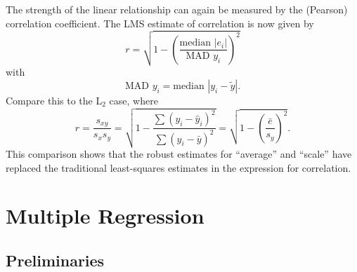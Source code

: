 The strength of the linear relationship can again be measured by the (Pearson) correlation 
coefficient.  The LMS estimate of correlation is now given by
\begin{equation}
r = \sqrt{ 1 - \left (\frac{\mbox{median } |e_i|}{\mbox{MAD } y_i} \right )^2}
\end{equation}	 
with
\begin{equation}
\mbox{MAD } y_i = \mbox{median } | y_i - \tilde{y} |.
\end{equation}	 	
Compare this to the L$_2$ case, where
\begin{equation}
r =  \frac{s_{xy}}{s_x s_y} =
     \sqrt{ 1 - \frac{\sum (y_i - \hat{y}_i)^2}{\sum (y_i - \bar{y})^2}} = \sqrt{ 1 - \left (\frac{\bar{e}}{s_y} \right )^2}.
\end{equation}
This comparison shows that the robust estimates for ``average'' and ``scale'' have replaced the traditional
least-squares estimates in the expression for correlation.	

\section{Multiple Regression}

\subsection{Preliminaries}

